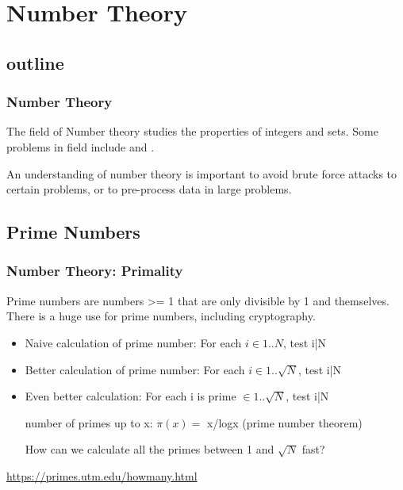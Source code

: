 \documentclass{beamer}
\begin{document}
\section{Number Theory}
\subsection{outline}
\begin{frame}
  \frametitle{Number Theory} {\small 

    The field of Number theory studies the properties of integers and
    sets. Some problems in field include  and
    .

    \bigskip
    
    An understanding of number theory is important to avoid brute
    force attacks to certain problems, or to pre-process data in large
    problems.}
\end{frame}

\subsection{Prime Numbers}
\begin{frame}
  \frametitle{Number Theory: Primality} 
  {\smaller
  Prime numbers are numbers >= 1 that are only divisible by 1 and
  themselves. There is a huge use for prime numbers, including 
  cryptography.

  \begin{itemize}
    
  \item Naive calculation of prime number: For each $i \in 1..N$, test i|N
    
  \item Better calculation of prime number: For each $i \in 1..\sqrt{N}$, test i|N
        
  \item Even better calculation: For each \alert{i is prime} $\in 1..\sqrt{N}$, test i|N\\

    \medskip

    number of primes up to x: $\pi(x) =$ x/logx (prime number theorem)
    
    \bigskip

    \begin{block}{}
    How can we calculate all the primes between 1 and $\sqrt{N}$ fast? 
    \end{block}

  \end{itemize}}

  \hfill {\tiny \url{https://primes.utm.edu/howmany.html}}
\end{frame}
\end{document}
